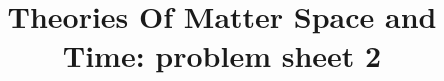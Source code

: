 \setcounter{secnumdepth}{4}
\setcounter{tocdepth}{4}

%

\title{Theories Of Matter Space and Time: problem sheet 2}

\maketitle{}
\section{}




















